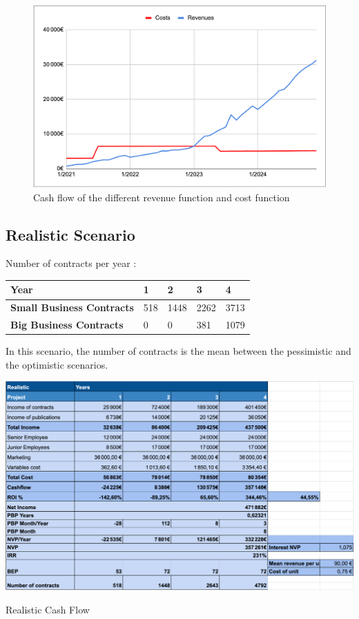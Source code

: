 \documentclass[./main.tex]{subfiles}
\begin{document}
\begin{figure}[h]
	\centering
	\includegraphics[width=15cm]{img/CashFlowPessimistic.png}
	\caption{Cash flow of the different revenue function and cost function}
	\label{fig:cashflow}
\end{figure}

\subsection{Realistic Scenario}
Number of contracts per year : 
\begin{table}[H]
	\centering
\begin{tabular}{|l|l|l|l|l|}
\hline
\textbf{Year}                     & 1  & 2   & 3   & 4   \\ \hline
\textbf{Small Business Contracts} & 518 & 1448 & 2262 & 3713 \\ \hline
\textbf{Big Business Contracts}   & 0  & 0   & 381  & 1079 \\ \hline
\end{tabular}
\end{table}
In this scenario, the number of contracts is the mean between the pessimistic and the optimistic scenarios.
\begin{table}[H]
	\centering
	\includegraphics[width=14cm]{img/mean.png}
	\caption{Realistic Cash Flow}
	\label{tab:realistic}
\end{table}
\end{document}
